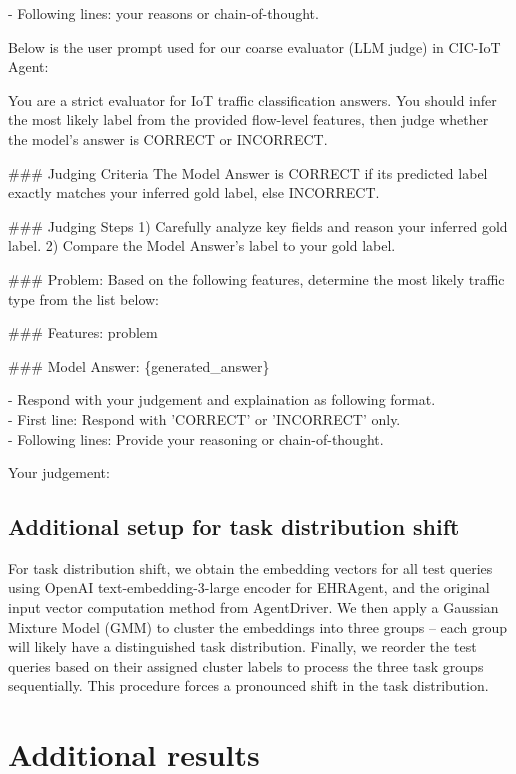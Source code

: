 \documentclass[11pt]{article}
\theoremstyle{plain}
\theoremstyle{definition}
\begin{document}
{\begin{tcolorbox}[userbox]
- Following lines: your reasons or chain-of-thought.
\end{tcolorbox}

Below is the user prompt used for our coarse evaluator (LLM judge) in CIC-IoT Agent:
\begin{tcolorbox}[userbox]

You are a strict evaluator for IoT traffic classification answers. You should infer the most likely label from the provided flow-level features, then judge whether the model’s answer is CORRECT or INCORRECT. 

\#\#\# Judging Criteria
The Model Answer is CORRECT if its predicted label exactly matches your inferred gold label, else INCORRECT.

\#\#\# Judging Steps
1) Carefully analyze key fields and reason your inferred gold label.
2) Compare the Model Answer’s label to your gold label.

\#\#\# Problem:
Based on the following features, determine the most likely traffic type from the list below:

\#\#\# Features:
{problem}

\#\#\# Model Answer:
\{generated\_answer\}

- Respond with your judgement and explaination as following format.\\
- First line: Respond with 'CORRECT' or 'INCORRECT' only.\\
- Following lines: Provide your reasoning or chain-of-thought.

Your judgement:
\end{tcolorbox}

\subsection{Additional setup for task distribution shift}
\label{app:task_dist_shift}
For task distribution shift, we obtain the embedding vectors for all test queries using OpenAI text-embedding-3-large encoder for EHRAgent, and the original input vector computation method from AgentDriver.
We then apply a Gaussian Mixture Model (GMM) to cluster the embeddings into three groups -- each group will likely have a distinguished task distribution.
Finally, we reorder the test queries based on their assigned cluster labels to process the three task groups sequentially.
This procedure forces a pronounced shift in the task distribution.

\section{Additional results}
}
\end{document}
